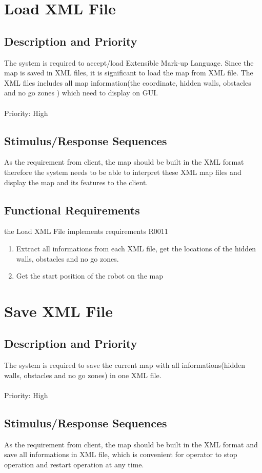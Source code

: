 \documentclass[11pt, a4paper]{report}
\begin{document}
\section{Load XML File}
\subsection{Description and Priority}
The system is required to accept/load Extensible Mark-up Language. Since the map is saved in XML files, it is significant to load the map from XML file. The XML files includes all map information(the coordinate, hidden walls, obstacles and no go zones ) which need to display on GUI.\\ \\
Priority: High
\subsection{Stimulus/Response Sequences}
As the requirement from client, the map should be built in the XML format therefore the system needs to be able to interpret these XML map files and display the map and its features to the client. 

\subsection{Functional Requirements}
the Load XML File implements requirements R0011
\begin{enumerate}
\item Extract all informations from each XML file, get the locations of the hidden walls, obstacles and no go zones.
\item Get the start position of the robot on the map  
\end{enumerate}
\section{Save XML File}
\subsection{Description and Priority}
The system is required to save the current map with all informations(hidden walls, obstacles and no go zones) in one XML file.\\ \\
Priority: High
\subsection{Stimulus/Response Sequences}
As the requirement from client, the map should be built in the XML format and save all informations in XML file, which is convenient for operator to stop operation and restart operation at any time.
\end{document}
